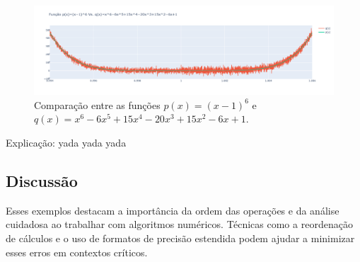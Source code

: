 \begin{figure}[H]
    \centering 
    \includegraphics[width=1\textwidth]{Imagens/error2.png}
    \caption{Comparação entre as funções $p(x) = (x - 1)^6$ e $q(x) = x^6 - 6x^5 + 15x^4 - 20x^3 + 15x^2 - 6x + 1$.}
    \label{fig:error2}
\end{figure}
Explicação: yada yada yada 

\subsection{Discussão}

Esses exemplos destacam a importância da ordem das operações e da análise cuidadosa ao trabalhar com algoritmos numéricos. Técnicas como a reordenação de cálculos e o uso de formatos de precisão estendida podem ajudar a minimizar esses erros em contextos críticos.
